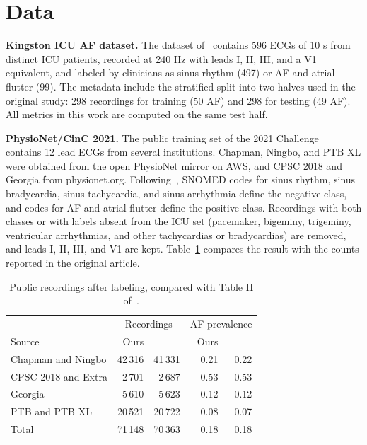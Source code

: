 \documentclass[conference,a4paper]{IEEEtran}
\begin{document}
\section{Data}
\label{sec:data}

\noindent\textbf{Kingston ICU AF dataset.} The dataset of~\cite{nassar2025} contains 596 ECGs of 10 s from distinct ICU patients, recorded at 240 Hz with leads I, II, III, and a V1 equivalent, and labeled by clinicians as sinus rhythm (497) or AF and atrial flutter (99). The metadata include the stratified split into two halves used in the original study: 298 recordings for training (50 AF) and 298 for testing (49 AF). All metrics in this work are computed on the same test half.

\noindent\textbf{PhysioNet/CinC 2021.} The public training set of the 2021 Challenge~\cite{reyna2021,goldberger2000} contains 12 lead ECGs from several institutions. Chapman, Ningbo, and PTB XL were obtained from the open PhysioNet mirror on AWS, and CPSC 2018 and Georgia from physionet.org. Following~\cite{nassar2025}, SNOMED codes for sinus rhythm, sinus bradycardia, sinus tachycardia, and sinus arrhythmia define the negative class, and codes for AF and atrial flutter define the positive class. Recordings with both classes or with labels absent from the ICU set (pacemaker, bigeminy, trigeminy, ventricular arrhythmias, and other tachycardias or bradycardias) are removed, and leads I, II, III, and V1 are kept. Table~\ref{tab:data} compares the result with the counts reported in the original article.

\begin{table}[t]
\centering
\caption{Public recordings after labeling, compared with Table II of~\cite{nassar2025}.}
\label{tab:data}
\begin{tabular}{lrrrr}
\toprule
& \multicolumn{2}{c}{Recordings} & \multicolumn{2}{c}{AF prevalence} \\
Source & Ours & \cite{nassar2025} & Ours & \cite{nassar2025} \\
\midrule
Chapman and Ningbo & 42\,316 & 41\,331 & 0.21 & 0.22 \\
CPSC 2018 and Extra & 2\,701 & 2\,687 & 0.53 & 0.53 \\
Georgia & 5\,610 & 5\,623 & 0.12 & 0.12 \\
PTB and PTB XL & 20\,521 & 20\,722 & 0.08 & 0.07 \\
\midrule
Total & 71\,148 & 70\,363 & 0.18 & 0.18 \\
\bottomrule
\end{tabular}
\end{table}
\end{document}
